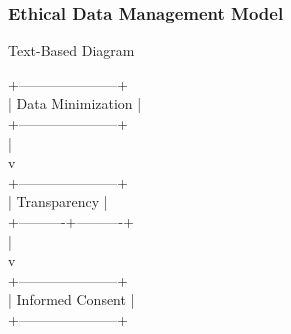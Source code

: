 \documentclass[aspectratio=169]{beamer}
\begin{document}
\begin{frame}[fragile]
    \frametitle{Ethical Data Management Model}
    \begin{block}{Text-Based Diagram}
        \begin{center}
        +---------------------+ \\
        |   Data Minimization  | \\
        +---------------------+ \\
                  | \\
                  v \\
        +---------------------+ \\
        |       Transparency   | \\
        +----------+----------+ \\
                   | \\
                   v \\
        +---------------------+ \\
        |    Informed Consent  | \\
        +---------------------+
        \end{center}
    \end{block}
\end{frame}
\end{document}
